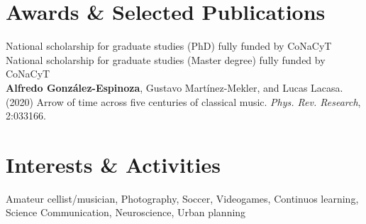 \documentclass[a4paper,5pt]{article}
\begin{document}
\section{Awards \& Selected Publications}
National scholarship for graduate studies (PhD) fully funded by CoNaCyT \\ 
National scholarship for graduate studies (Master degree) fully funded by CoNaCyT \\
\textbf{Alfredo González-Espinoza}, Gustavo Martínez-Mekler, and Lucas Lacasa. (2020) Arrow of
time across five centuries of classical music.  \textit{Phys. Rev. Research}, 2:033166.
\section{Interests \& Activities}
Amateur cellist/musician, Photography, Soccer, Videogames, Continuos learning, Science Communication, Neuroscience, Urban planning
\vfill
\end{document}
